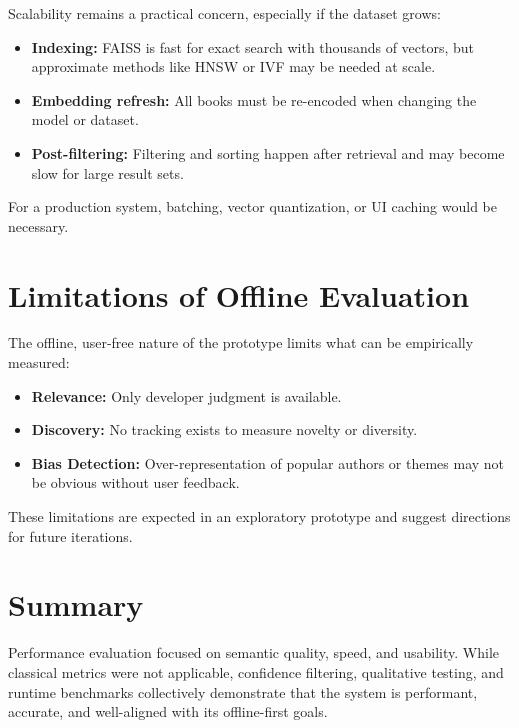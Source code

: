 Scalability remains a practical concern, especially if the dataset grows:

\begin{itemize}
    \item \textbf{Indexing:} FAISS is fast for exact search with thousands of vectors, but approximate methods like HNSW or IVF may be needed at scale.
    \item \textbf{Embedding refresh:} All books must be re-encoded when changing the model or dataset.
    \item \textbf{Post-filtering:} Filtering and sorting happen after retrieval and may become slow for large result sets.
\end{itemize}

For a production system, batching, vector quantization, or UI caching would be necessary.

\section{Limitations of Offline Evaluation}
\label{sec:limitations}

The offline, user-free nature of the prototype limits what can be empirically measured:

\begin{itemize}
    \item \textbf{Relevance:} Only developer judgment is available.
    \item \textbf{Discovery:} No tracking exists to measure novelty or diversity.
    \item \textbf{Bias Detection:} Over-representation of popular authors or themes may not be obvious without user feedback.
\end{itemize}

These limitations are expected in an exploratory prototype and suggest directions for future iterations.

\section{Summary}
\label{sec:performance-summary}

Performance evaluation focused on semantic quality, speed, and usability. 
While classical metrics were not applicable, confidence filtering, qualitative testing, and runtime benchmarks collectively demonstrate that the system is performant, accurate, and well-aligned with its offline-first goals.
